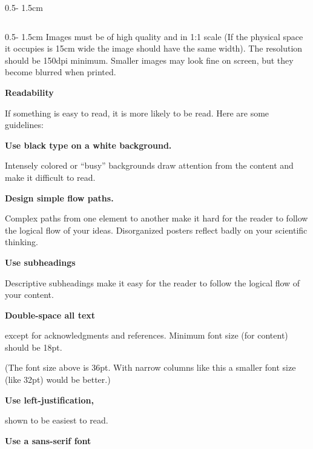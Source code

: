 \documentclass{uibposter}
\begin{document}
\begin{frame}
\begin{columns}
\begin{column}{0.5\textwidth - 1.5cm}
\begin{column}{0.5\textwidth - 1.5cm}
    Images must be of high quality and in 1:1 scale (If the physical space it occupies is 15cm wide the image should have the same width). The  resolution should be 150dpi minimum. Smaller images may look fine on screen, but they become blurred when printed.


    \vspace{1.cm}
    
    \textbf{Readability}
\vspace{0.5cm}

    If something is easy to read, it is more likely to be read. Here are some guidelines:

\vspace{0.5cm}

    \textbf{Use black type on a white background.}
    \vspace{0.2cm}

    Intensely colored or “busy” backgrounds draw attention from the content and make it difficult to read.
\vspace{0.5cm}

    \textbf{Design simple flow paths.}
    \vspace{0.2cm}

    Complex paths from one element to another make it hard for the reader to follow the logical flow of your ideas. Disorganized posters reflect badly on your scientific thinking. 
\vspace{0.5cm}

    \textbf{Use subheadings}
    \vspace{0.2cm}

    Descriptive subheadings make it easy for the reader to follow the logical flow of your content.
\vspace{0.5cm}

    \textbf{Double-space all text}
    \vspace{0.2cm}

    except for acknowledgments and references. Minimum font size (for content) should be 18pt. 

    (The font size above is 36pt. With narrow columns like this a smaller font size (like 32pt) would be better.)
\vspace{0.5cm}

    \textbf{Use left-justification,}
    \vspace{0.2cm}

    shown to be easiest to read.
\vspace{0.5cm}

    \textbf{Use a sans-serif font}
    \vspace{0.2cm}


\end{column}
\end{column}
\end{columns}
\end{frame}
\end{document}
